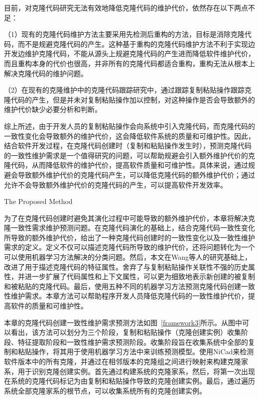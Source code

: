 目前，对克隆代码研究无法有效地降低克隆代码的维护代价，依然存在以下两点不足：

（1）现有的克隆代码维护方法主要采用先检测后重构的方法，目标是消除克隆代码，而不是规避克隆代码的产生。这种基于重构的克隆代码维护方法不利于实现边开发边维护克隆代码，不能从源头上规避克隆代码的产生进而降低软件维护代价，而且重构本身的代价也很高，并非所有的克隆代码都适合重构，重构无法从根本上解决克隆代码的维护问题。

（2）在现有的克隆维护中的克隆代码跟踪研究中，通过跟踪复制粘贴操作跟踪克隆代码的产生，但是并未对复制粘贴操作加以控制，对这种操作是否会导致额外的维护代价缺少必要分析和判断。

综上所述，由于开发人员的复制粘贴操作会向系统中引入克隆代码，而克隆代码的一致性变化会导致额外的维护代价，这会降低软件系统的质量和可维护性。因此，结合软件开发过程，在克隆代码创建时（复制和粘贴操作发生时），预测克隆代码的一致性维护需求是一个值得研究的问题，可以帮助规避会引入额外维护代价的克隆代码，从而降低软件的维护代价，提高软件质量和可维护性。具体来说，通过规避会导致额外维护代价的克隆代码产生，可以降低克隆代码的额外维护代价；通过允许不会导致额外维护代价的克隆代码的产生，可以提高软件开发效率。

{The Proposed Method}

为了在克隆代码创建时避免其演化过程中可能导致的额外维护代价，本章将解决克隆一致性需求维护预测问题。在克隆代码演化的基础上，结合克隆代码一致性变化所导致的额外维护代价，给出了一种克隆代码创建时的一致性变化以及一致性维护需求的定义。定义不仅可以描述克隆代码所导致的维护代价，还将问题转化为一个可以使用机器学习方法解决的分类问题。然后，本文在Wang\cite{wang2014predicting}等人的研究基础上，改进了用于描述克隆代码的特征属性。舍弃了与复制粘贴操作关联性不强的历史属性，并进一步扩展了代码属性和上下文属性，可以更为细致地表示新创建的被复制和被粘贴的克隆代码。最后，使用五种不同的机器学习方法预测克隆代码创建一致性维护需求。本章方法可以帮助程序开发人员降低克隆代码的一致性维护代价，提高软件的质量和可维护性。

本章的克隆代码创建一致性维护需求预测方法如图~\ref{framework3}所示。从图中可以看出，该方法可以划分为三个阶段，复制和粘贴操作（克隆创建实例）收集阶段、特征提取阶段和一致性维护需求预测阶段。收集阶段旨在收集系统中全部的复制和粘贴操作，将其用于使用机器学习方法中来训练预测模型。使用NiCad来检测软件版本中的所有克隆，并通过在相邻版本的克隆组之间进行映射来构建克隆家系，用于识别克隆创建实例。首先通过构建系统的克隆家系，然后，将第一次出现在系统的克隆代码标记为由复制和粘贴操作导致的克隆创建实例。最后，通过遍历系统全部克隆家系的根节点，可以收集系统所有的克隆创建实例。

